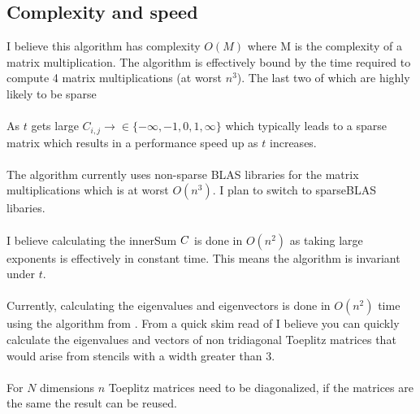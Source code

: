 \documentclass{article}
\begin{document}
\subsection*{Complexity and speed}
I believe this algorithm has complexity $O(M)$ where M is the complexity of a matrix multiplication. 
The algorithm is effectively bound by the time required to compute 4 matrix multiplications (at worst $n^3$). The last two of which are highly likely to be sparse \\ \\
As $t$ gets large $C_{i,j} \rightarrow \in \{- \infty, -1, 0, 1, \infty\}$ which typically leads to a sparse matrix 
which results in a performance speed up as $t$ increases.\\ \\
The algorithm currently uses non-sparse BLAS libraries for the matrix multiplications which is at worst $O(n^3)$. 
I plan to switch to sparseBLAS libaries.  \\ \\
I believe calculating the innerSum $C$ is done in $O(n^2)$ as taking large exponents is effectively in constant time. 
This means the algorithm is invariant under $t$. \\ \\ 
Currently, calculating the eigenvalues and eigenvectors is done in $O(n^2)$ time using the algorithm from \cite{noschese2013tridiagonal}.
From a quick skim read of \cite{bogoya2022fast} I believe you can quickly calculate the eigenvalues and vectors of non tridiagonal Toeplitz 
matrices that would arise from stencils with a width greater than 3. \\ \\
For $N$ dimensions $n$ Toeplitz matrices need to be diagonalized, if the matrices are the same the result can be reused. 
\end{document}
